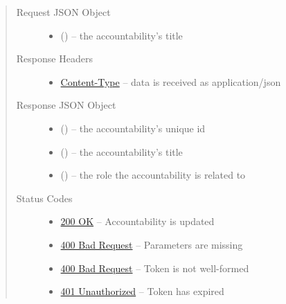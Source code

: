 \documentclass[letterpaper,10pt,english]{sphinxmanual}
\begin{document}
\begin{fulllineitems}
\begin{quote}
\begin{description}
\item[{Request JSON Object}] \leavevmode\begin{itemize}
\item {} 
 () -- the accountability's title

\end{itemize}

\item[{Response Headers}] \leavevmode\begin{itemize}
\item {} 
\href{http://tools.ietf.org/html/rfc7231\#section-3.1.1.5}{Content-Type} -- data is received as application/json

\end{itemize}

\item[{Response JSON Object}] \leavevmode\begin{itemize}
\item {} 
 () -- the accountability's unique id

\item {} 
 () -- the accountability's title

\item {} 
 () -- the role the accountability is related to

\end{itemize}

\item[{Status Codes}] \leavevmode\begin{itemize}
\item {} 
\href{http://www.w3.org/Protocols/rfc2616/rfc2616-sec10.html\#sec10.2.1}{200 OK} -- Accountability is updated

\item {} 
\href{http://www.w3.org/Protocols/rfc2616/rfc2616-sec10.html\#sec10.4.1}{400 Bad Request} -- Parameters are missing

\item {} 
\href{http://www.w3.org/Protocols/rfc2616/rfc2616-sec10.html\#sec10.4.1}{400 Bad Request} -- Token is not well-formed

\item {} 
\href{http://www.w3.org/Protocols/rfc2616/rfc2616-sec10.html\#sec10.4.2}{401 Unauthorized} -- Token has expired


\end{itemize}
\end{description}
\end{quote}
\end{fulllineitems}
\end{document}
